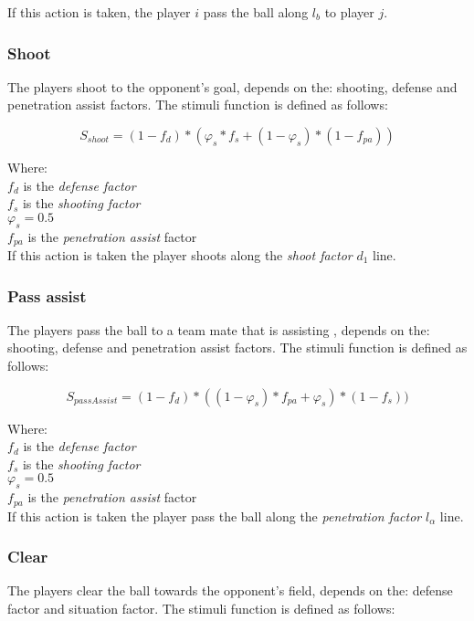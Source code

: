 \documentclass[
10pt, %
a4paper, %
oneside, %
headinclude,footinclude, %
BCOR5mm, %
]{scrartcl}
\begin{document}
If this action is taken, the player $i$ pass the ball along $l_b$ to player $j$.

\subsubsection{Shoot}

The players shoot to the opponent's goal, depends on the: shooting, defense and penetration assist factors. The stimuli function is defined as follows:

\begin{equation}
	S_{shoot} = (1 - f_d) * (\varphi_s * f_s + (1 - \varphi_{s})* (1 - f_{pa}) )
\end{equation}

Where:\\
$f_d$ is the \textit{defense factor} \\
$f_s$ is the \textit{shooting factor} \\
$\varphi_{s} = 0.5$ \\
$f_{pa}$ is the \textit{penetration assist} factor\\

If this action is taken the player shoots along the \textit{shoot factor} $d_1$ line.

\subsubsection{Pass assist}

The players pass the ball to a team mate that is assisting , depends on the: shooting, defense and penetration assist factors. The stimuli function is defined as follows:

\begin{equation}
	S_{passAssist} = (1-f_d) * ((1-\varphi_s) * f_{pa} +  \varphi_{s})* (1-f_{s}) )
\end{equation}

Where:\\
$f_d$ is the \textit{defense factor} \\
$f_s$ is the \textit{shooting factor} \\
$\varphi_{s} = 0.5$ \\
$f_{pa}$ is the \textit{penetration assist} factor\\

If this action is taken the player pass the ball along the \textit{penetration factor} $l_\alpha$ line.

\subsubsection{Clear}
 The players clear the ball towards the opponent's field, depends on the: defense factor and situation factor. The stimuli function is defined as follows:
 
\end{document}
